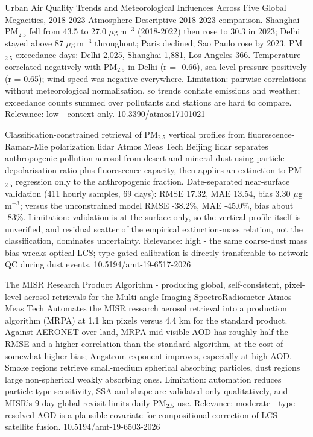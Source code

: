 \documentclass[10pt]{article}
\begin{document}
{Urban Air Quality Trends and Meteorological Influences Across Five Global Megacities, 2018-2023}
{Atmosphere}
{Descriptive 2018-2023 comparison. Shanghai PM$_{2.5}$ fell from 43.5 to 27.0 $\mu$g\,m$^{-3}$ (2018-2022) then rose to 30.3 in 2023; Delhi stayed above 87 $\mu$g\,m$^{-3}$ throughout; Paris declined; Sao Paulo rose by 2023. PM$_{2.5}$ exceedance days: Delhi 2,025, Shanghai 1,881, Los Angeles 366. Temperature correlated negatively with PM$_{2.5}$ in Delhi (r = -0.66), sea-level pressure positively (r = 0.65); wind speed was negative everywhere. Limitation: pairwise correlations without meteorological normalisation, so trends conflate emissions and weather; exceedance counts summed over pollutants and stations are hard to compare. Relevance: low - context only.}
{10.3390/atmos17101021}

\par{}\baselineskip{}\baselineskip
{}

{Classification-constrained retrieval of PM$_{2.5}$ vertical profiles from fluorescence-Raman-Mie polarization lidar}
{Atmos Meas Tech}
{Beijing lidar separates anthropogenic pollution aerosol from desert and mineral dust using particle depolarisation ratio plus fluorescence capacity, then applies an extinction-to-PM$_{2.5}$ regression only to the anthropogenic fraction. Date-separated near-surface validation (411 hourly samples, 69 days): RMSE 17.32, MAE 13.54, bias 3.30 $\mu$g\,m$^{-3}$; versus the unconstrained model RMSE -38.2\%, MAE -45.0\%, bias about -83\%. Limitation: validation is at the surface only, so the vertical profile itself is unverified, and residual scatter of the empirical extinction-mass relation, not the classification, dominates uncertainty. Relevance: high - the same coarse-dust mass bias wrecks optical LCS; type-gated calibration is directly transferable to network QC during dust events.}
{10.5194/amt-19-6517-2026}

{The MISR Research Product Algorithm - producing global, self-consistent, pixel-level aerosol retrievals for the Multi-angle Imaging SpectroRadiometer}
{Atmos Meas Tech}
{Automates the MISR research aerosol retrieval into a production algorithm (MRPA) at 1.1 km pixels versus 4.4 km for the standard product. Against AERONET over land, MRPA mid-visible AOD has roughly half the RMSE and a higher correlation than the standard algorithm, at the cost of somewhat higher bias; Angstrom exponent improves, especially at high AOD. Smoke regions retrieve small-medium spherical absorbing particles, dust regions large non-spherical weakly absorbing ones. Limitation: automation reduces particle-type sensitivity, SSA and shape are validated only qualitatively, and MISR's 9-day global revisit limits daily PM$_{2.5}$ use. Relevance: moderate - type-resolved AOD is a plausible covariate for compositional correction of LCS-satellite fusion.}
{10.5194/amt-19-6503-2026}
\end{document}
